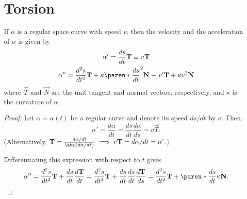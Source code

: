 \documentclass[11pt]{penrose}
\newcommand{\vT}{\vec{T}}
\newcommand{\vN}{\vec{N}}
\begin{document}
\section{Torsion}

\begin{nlemma}
    If $\alpha$ is a regular space curve with speed $v$, then the velocity and the acceleration of $\alpha$ is given by
    \begin{gather}
        \alpha' = \frac{ds}{dt} \vT \equiv v \vT\\
        \alpha'' = \frac{d^2 s}{dt^2} \vT + \kappa \paren*{\frac{ds}{dt}}^2 \vN \equiv v' \vT + \kappa v^2 \vN
    \end{gather}
    where $\vT$ and $\vN$ are the unit tangent and normal vectors, respectively, and $\kappa$ is the curvature of $\alpha$.
\end{nlemma}
\begin{proof}
    Let $\alpha = \alpha(t)$ be a regular curve and denote its speed $ds/dt$ by $v$. Then,
    \begin{equation}
        \alpha'
        = \frac{d\alpha}{dt}
        = \frac{ds}{dt} \frac{d\alpha}{ds}
        = v \vT.
    \end{equation}
    (Alternatively, $\vT = \frac{d\alpha/dt}{\abs{d\alpha/dt}} \implies v \vT = d\alpha/dt = \alpha'$.)

    Differentiating this expression with respect to $t$ gives
    \begin{equation}
        \alpha''
        = \frac{d^2 s}{dt^2} \vT + \frac{ds}{dt} \frac{d\vT}{dt}
        = \frac{d^2 s}{dt^2} \vT + \frac{ds}{dt} \frac{ds}{dt} \frac{d\vT}{ds}
        = \frac{d^2 s}{dt^2} \vT + \paren*{\frac{ds}{dt}} \kappa \vN.
    \end{equation}
\end{proof}
\end{document}
